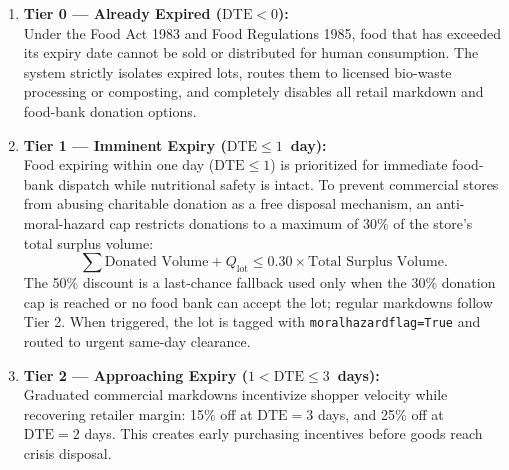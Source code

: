 \documentclass[12pt,a4paper]{article}
\renewcommand{\_}{\oldunderscore\allowbreak}
\begin{document}
\begin{enumerate}[leftmargin=18pt, itemsep=3pt]
    \item \textbf{Tier 0 --- Already Expired ($\text{DTE} < 0$):}\\
    Under the Food Act 1983 and Food Regulations 1985, food that has exceeded its expiry date cannot be sold or distributed for human consumption. The system strictly isolates expired lots, routes them to licensed bio-waste processing or composting, and completely disables all retail markdown and food-bank donation options.

    \item \textbf{Tier 1 --- Imminent Expiry ($\text{DTE} \le 1$~day):}\\
    Food expiring within one day ($\text{DTE} \le 1$) is prioritized for immediate food-bank dispatch while nutritional safety is intact. To prevent commercial stores from abusing charitable donation as a free disposal mechanism, an anti-moral-hazard cap restricts donations to a maximum of 30\% of the store's total surplus volume:
    \begin{equation}
        \sum \text{Donated Volume} + Q_{\text{lot}} \le 0.30 \times \text{Total Surplus Volume}.
    \end{equation}
    The 50\% discount is a last-chance fallback used only when the 30\% donation cap is reached or no food bank can accept the lot; regular markdowns follow Tier 2. When triggered, the lot is tagged with \texttt{moral\_hazard\_flag=True} and routed to urgent same-day clearance.

    \item \textbf{Tier 2 --- Approaching Expiry ($1 < \text{DTE} \le 3$~days):}\\
    Graduated commercial markdowns incentivize shopper velocity while recovering retailer margin: 15\% off at $\text{DTE} = 3$ days, and 25\% off at $\text{DTE} = 2$ days. This creates early purchasing incentives before goods reach crisis disposal.


\end{enumerate}
\end{document}
